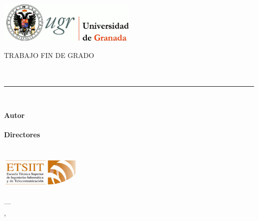 \documentclass[../proyecto.tex]{book}
\begin{document}
\begin{titlingpage}

  \newlength{\centeroffset}
  \setlength{\centeroffset}{-0.5\oddsidemargin}
  \addtolength{\centeroffset}{0.5\evensidemargin}
  \thispagestyle{empty}

  \noindent\hspace*{\centeroffset}
  \begin{minipage}{\textwidth}
    \vspace{-2cm}
    \centering
    \includegraphics[width=0.5\textwidth]{images/logo_ugr.jpg}

    \textsc{ \Large TRABAJO FIN DE GRADO\\[0.2cm]}
    \textsc{ \Degree }\\[1cm]

    {\Large\bfseries \ProjectTitle\\
    }
    \noindent\rule[-1ex]{\textwidth}{3pt}\\[3.5ex]
  \end{minipage}

  \vspace{2cm}
  \noindent\hspace*{\centeroffset}\begin{minipage}{\textwidth}
    \centering

    \textbf{Autor}\\ {\AuthorName}\\[2.5ex]
    \textbf{Directores}\\
    {\MainProf\\
     \SecondProf}\\[2cm]
    \includegraphics[width=0.3\textwidth]{images/etsiit_logo.png}\\[0.1cm]
    \textsc{\Faculty}\\
    \textsc{---}\\
    \Location, \Time
  \end{minipage}

\end{titlingpage}
\end{document}
